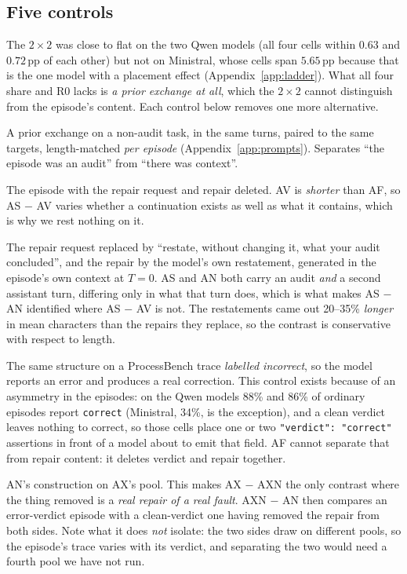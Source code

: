 \documentclass[11pt]{article}
\newcommand{\pp}{\,\text{pp}}
\begin{document}
\subsection{Five controls}
\label{sec:controls}

The $2\times2$ was close to flat on the two Qwen models (all four cells within $0.63$ and
$0.72\pp$ of each other) but not on Ministral, whose cells span $5.65\pp$ because that is the one
model with a placement effect (Appendix~\ref{app:ladder}). What all four share and R0 lacks is
\emph{a prior exchange at all}, which the $2\times2$ cannot distinguish from the episode's content.
Each control below removes one more alternative.

\begin{description}[topsep=2pt,itemsep=1pt,leftmargin=*,font=\normalfont\bfseries]
\item[AF, length-matched filler.] A prior exchange on a non-audit task, in the
  same turns, paired to the same targets, length-matched \emph{per episode}
  (Appendix~\ref{app:prompts}). Separates ``the episode was an audit'' from ``there was context''.
\item[AV, audit only.] The episode with the repair request and repair deleted. AV is \emph{shorter}
  than AF, so AS $-$ AV varies whether a continuation exists as well as what it contains, which is
  why we rest nothing on it.
\item[AN, inert continuation.] The repair request replaced by ``restate, without changing it, what your
  audit concluded'', and the repair by the model's own restatement, generated in the episode's own
  context at $T{=}0$. AS and AN both carry an audit \emph{and} a second assistant turn, differing only
  in what that turn does, which is what makes AS $-$ AN identified where AS $-$ AV is not. The
  restatements came out 20--35\% \emph{longer} in mean characters than the repairs they replace, so the
  contrast is conservative with respect to length.
\item[AX, incorrect verdict.] The same structure on a ProcessBench trace \emph{labelled incorrect}, so
  the model reports an error and produces a real correction. This control exists because of an
  asymmetry in the episodes: on the Qwen models 88\% and 86\% of ordinary episodes
  report \texttt{correct} (Ministral, 34\%, is the exception), and a clean verdict leaves nothing to
  correct, so those cells place one or two \texttt{"verdict": "correct"} assertions in front of a model
  about to emit that field. AF cannot separate that from repair content: it deletes verdict and
  repair together.
\item[AXN, inert continuation on the fault.] AN's construction on AX's pool.
  This makes AX $-$ AXN the only contrast where the thing removed is a \emph{real repair of a real
  fault}. AXN $-$ AN then compares an error-verdict episode with a clean-verdict one having removed the
  repair from both sides. Note what it does \emph{not} isolate: the two sides draw on different pools,
  so the episode's trace varies with its verdict, and separating the two would need a fourth pool we
  have not run.
\end{description}
\end{document}
